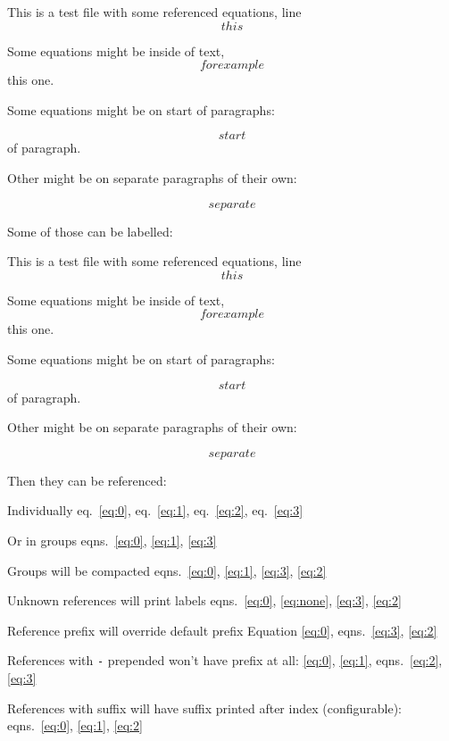 This is a test file with some referenced equations, line \[ this \]

Some equations might be inside of text, \[ for example \] this one.

Some equations might be on start of paragraphs:

\[ start \] of paragraph.

Other might be on separate paragraphs of their own:

\[ separate \]

Some of those can be labelled:

This is a test file with some referenced equations, line
\protect\hypertarget{eq:0}{}{\begin{equation} this \label{eq:0}\end{equation}}

Some equations might be inside of text,
\protect\hypertarget{eq:1}{}{\begin{equation} for example \label{eq:1}\end{equation}}
this one.

Some equations might be on start of paragraphs:

\protect\hypertarget{eq:2}{}{\begin{equation} start \label{eq:2}\end{equation}}
of paragraph.

Other might be on separate paragraphs of their own:

\protect\hypertarget{eq:3}{}{\begin{equation} separate \label{eq:3}\end{equation}}

Then they can be referenced:

Individually eq.~\ref{eq:0}, eq.~\ref{eq:1}, eq.~\ref{eq:2},
eq.~\ref{eq:3}

Or in groups eqns.~\ref{eq:0}, \ref{eq:1}, \ref{eq:3}

Groups will be compacted
eqns.~\ref{eq:0}, \ref{eq:1}, \ref{eq:3}, \ref{eq:2}

Unknown references will print labels
eqns.~\ref{eq:0}, \ref{eq:none}, \ref{eq:3}, \ref{eq:2}

Reference prefix will override default prefix Equation \ref{eq:0},
eqns.~\ref{eq:3}, \ref{eq:2}

References with \texttt{-} prepended won't have prefix at all:
\ref{eq:0}, \ref{eq:1}, eqns.~\ref{eq:2}, \ref{eq:3}

References with suffix will have suffix printed after index
(configurable): eqns.~\ref{eq:0}, \ref{eq:1}, \ref{eq:2}
